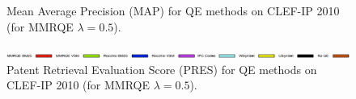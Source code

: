 \documentclass[xcolor=x11names,compress]{beamer}
\renewcommand{\(}{\begin{columns}}
\renewcommand{\)}{\end{columns}}
\newcommand{\<}[1]{\begin{column}{#1}}
\renewcommand{\>}{\end{column}}
\begin{document}
\begin{frame}
\begin{figure}
\caption{Mean Average Precision (MAP) for QE methods on CLEF-IP 2010 (for MMRQE
$\lambda=0.5$).}
\label{fig:MAP-CLEF2010}
\end{figure}

\begin{figure}
\begin{centering}
\includegraphics[width=17cm]{../img/legendQE}
\par\end{centering}

\begin{centering}
\par\end{centering}

\begin{centering}
\par\end{centering}

\caption{Patent Retrieval Evaluation Score (PRES) for QE methods on CLEF-IP
2010 (for MMRQE $\lambda=0.5$).}
\label{fig:PRES-CLEF2010}
\end{figure}
\end{frame}
\end{document}
